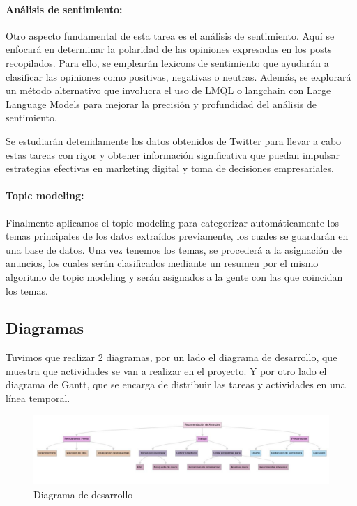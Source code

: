 \documentclass[
  letterpaper,
  DIV=11,
  numbers=noendperiod]{scrartcl}
\let\oldparagraph\paragraph
\renewcommand{\paragraph}[1]{\oldparagraph{#1}\mbox{}}
\begin{document}
\paragraph{Análisis de sentimiento:}\label{anuxe1lisis-de-sentimiento}

Otro aspecto fundamental de esta tarea es el análisis de sentimiento.
Aquí se enfocará en determinar la polaridad de las opiniones expresadas
en los posts recopilados. Para ello, se emplearán lexicons de
sentimiento que ayudarán a clasificar las opiniones como positivas,
negativas o neutras. Además, se explorará un método alternativo que
involucra el uso de LMQL o langchain con Large Language Models para
mejorar la precisión y profundidad del análisis de sentimiento.

Se estudiarán detenidamente los datos obtenidos de Twitter para llevar a
cabo estas tareas con rigor y obtener información significativa que
puedan impulsar estrategias efectivas en marketing digital y toma de
decisiones empresariales.

\paragraph{Topic modeling:}\label{topic-modeling}

Finalmente aplicamos el topic modeling para categorizar automáticamente
los temas principales de los datos extraídos previamente, los cuales se
guardarán en una base de datos. Una vez tenemos los temas, se procederá
a la asignación de anuncios, los cuales serán clasificados mediante un
resumen por el mismo algoritmo de topic modeling y serán asignados a la
gente con las que coincidan los temas.

\newpage{}

\subsection{Diagramas}\label{diagramas}

Tuvimos que realizar 2 diagramas, por un lado el diagrama de desarrollo,
que muestra que actividades se van a realizar en el proyecto. Y por otro
lado el diagrama de Gantt, que se encarga de distribuir las tareas y
actividades en una línea temporal.

\begin{figure}[H]

{\centering \includegraphics{diagrama de desarrollo.png}

}

\caption{Diagrama de desarrollo}

\end{figure}%
\end{document}
